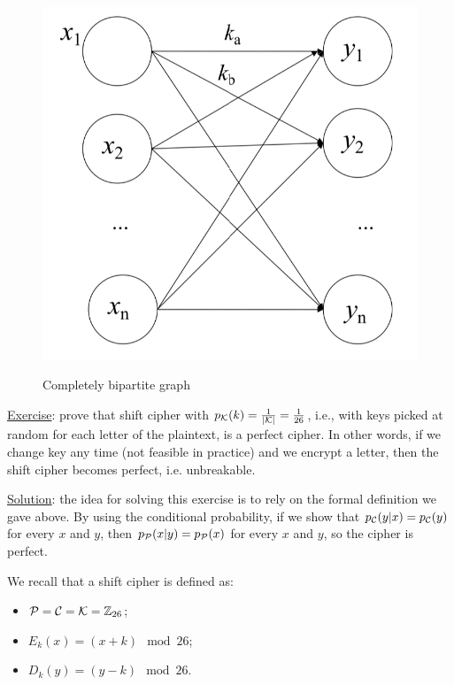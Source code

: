 \begin{figure}[h!]
        \centering
        \includegraphics[scale = 0.65]{img/perfect1.png}
        \label{perfect1}
        \caption{Completely bipartite graph}
\end{figure}

\underline{Exercise}: prove that shift cipher with $p_{\cal K}(k) = \frac{1}{|{\cal K}|}=\frac{1}{26}$, i.e., with keys picked at random for each letter of the plaintext, is a perfect cipher. In other words, if we change key any time (not feasible in practice) and we encrypt a letter, then the shift cipher becomes perfect, i.e. unbreakable.

\underline{Solution}: the idea for solving this exercise is to rely on the formal definition we gave above. By using the conditional probability, if we show that $p_{\cal C}(y|x) = p_{\cal C}(y)$ for every $x$ and $y$, then $p_{\cal P}(x|y) = p_{\cal P}(x)$ for every $x$ and $y$, so the cipher is perfect. 

We recall that a shift cipher is defined as:

\begin{itemize}
    \item ${\cal P}={\cal C}={\cal K}=\mathbb{Z}_{26}$;
    \item $E_k(x) = (x+k) \mod 26$;
    \item $D_k(y) = (y-k) \mod 26$.
\end{itemize}

